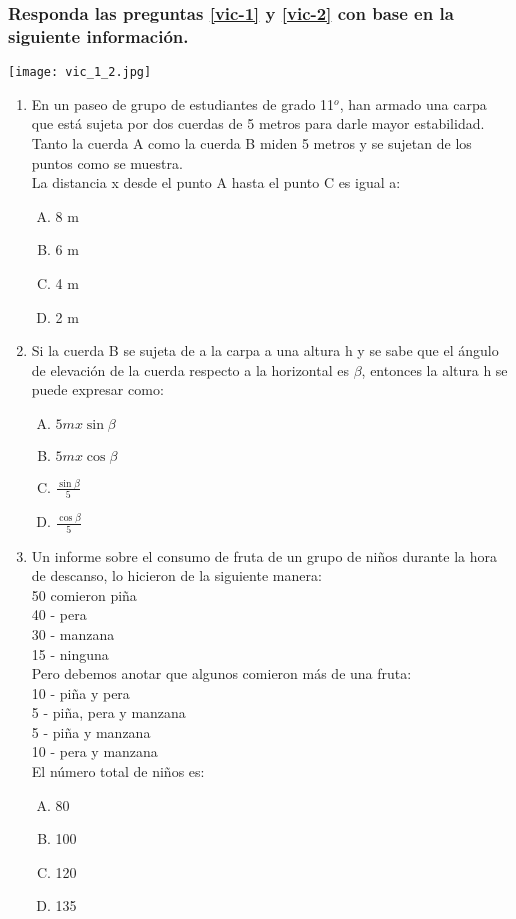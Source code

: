 
\subsubsection*{Responda las preguntas \ref{vic-1} y \ref{vic-2} con base en la siguiente informaci\'on.}

\texttt{[image: vic\_1\_2.jpg]}
\begin{enumerate}
\item En un paseo de grupo de estudiantes de grado 11$^o$, han armado una carpa que est\'a sujeta por dos cuerdas de 5 metros para darle mayor estabilidad. Tanto la cuerda A como la cuerda B  miden 5 metros y se sujetan de los puntos como se muestra. \label{vic-1}\\

La distancia x desde el punto A hasta el punto C es igual a:
\begin{enumerate}[(A)]
\item 8 m
\item 6 m 
\item 4 m 
\item 2 m
\end{enumerate}

\newpage
\item Si la cuerda B se sujeta de a la carpa a una altura h  y se sabe que el ángulo de elevación de la cuerda respecto a la horizontal es  $\beta$, entonces la altura h se puede expresar como:\label{vic-2}

\begin{enumerate}[(A)]
\item $5m x \sin\beta$
\item $5m x \cos\beta$
\item	$\frac{\sin\beta}{5}$
\item $\frac{\cos\beta}{5}$
\end{enumerate}
\item Un informe sobre el consumo de fruta de un grupo de niños durante la hora de descanso, lo hicieron de la siguiente \label{vic-3} manera:\\
50 comieron piña \\
40 - pera \\
30 - manzana\\
15 - ninguna\\
Pero debemos anotar que algunos comieron más de una fruta:\\
10 - piña y pera\\
5 - piña, pera y manzana\\
5 - piña y manzana\\
10 - pera y manzana\\
El número total de niños es:
\begin{enumerate}[(A)]
\item 80
\item 100
\item 120 
\item 135
\end{enumerate}



\end{enumerate}
